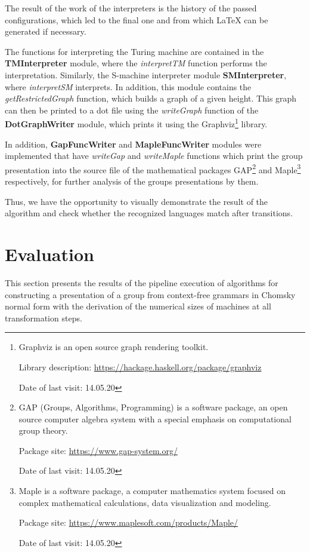 \documentclass[conference]{IEEEtran}
\theoremstyle{definition}
\begin{document}
The result of the work of the interpreters is the history of the passed configurations, which led to the final one and from which LaTeX can be generated if necessary.

The functions for interpreting the Turing machine are contained in the \textbf{TMInterpreter} module, where the \textit{interpretTM} function performs the interpretation. Similarly, the S-machine interpreter module \textbf{SMInterpreter}, where \textit{interpretSM} interprets.
In addition, this module contains the \textit{getRestrictedGraph} function, which builds a graph of a given height. This graph can then be printed to a dot file using the \textit{writeGraph} function of the \textbf{DotGraphWriter} module, which prints it using the Graphviz\footnote{Graphviz is an open source graph rendering toolkit.

Library description: \url{https://hackage.haskell.org/package/graphviz}

Date of last visit: 14.05.20} library.

In addition, \textbf{GapFuncWriter} and \textbf{MapleFuncWriter} modules were implemented that have \textit{writeGap} and \textit{writeMaple} functions which print the group presentation into the source file of the mathematical packages GAP\footnote{GAP (Groups, Algorithms, Programming) is a software package, an open source computer algebra system with a special emphasis on computational group theory.

Package site: \url{https://www.gap-system.org/}

Date of last visit: 14.05.20} and Maple\footnote{Maple is a software package, a computer mathematics system focused on complex mathematical calculations, data visualization and modeling.

Package site: \url{https://www.maplesoft.com/products/Maple/}

Date of last visit: 14.05.20} respectively, for further analysis of the groups presentations by them.

Thus, we have the opportunity to visually demonstrate the result of the algorithm and check whether the recognized languages match after transitions.

\section{Evaluation}

This section presents the results of the pipeline execution of algorithms for constructing a presentation of a group from context-free grammars in Chomsky normal form with the derivation of the numerical sizes of machines at all transformation steps.
    
\end{document}
